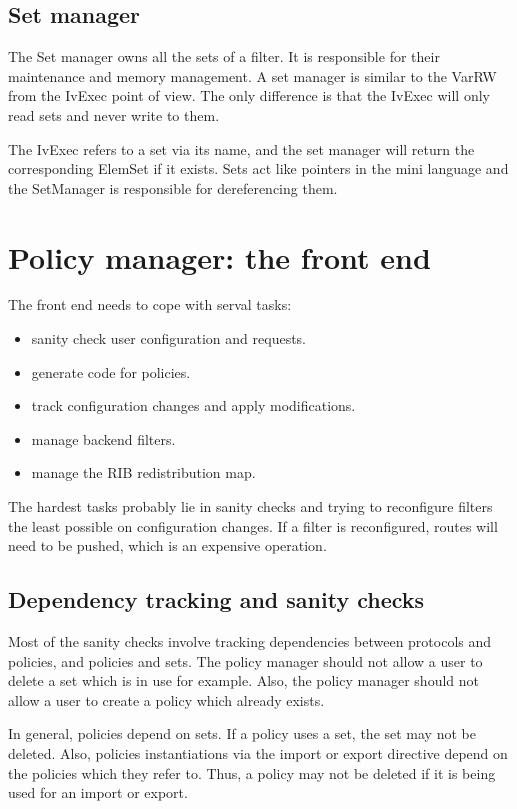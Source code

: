 \documentclass{article}
\begin{document}
\subsection{Set manager}
The Set manager owns all the sets of a filter. It is responsible for their
maintenance and memory management. A set manager is similar to the VarRW from
the IvExec point of view. The only difference is that the IvExec will only read
sets and never write to them.

The IvExec refers to a set via its name, and the set manager will return the
corresponding ElemSet if it exists. Sets act like pointers in the mini language
and the SetManager is responsible for dereferencing them.


\section{Policy manager: the front end}
The front end needs to cope with serval tasks:
\begin{itemize}
\item sanity check user configuration and requests.
\item generate code for policies.
\item track configuration changes and apply modifications.
\item manage backend filters.
\item manage the RIB redistribution map.
\end{itemize}
The hardest tasks probably lie in sanity checks and trying to reconfigure
filters the least possible on configuration changes. If a filter is
reconfigured, routes will need to be pushed, which is an expensive operation.

\subsection{Dependency tracking and sanity checks}
Most of the sanity checks involve tracking dependencies between protocols and
policies, and policies and sets. The policy manager should not allow a user to
delete a set which is in use for example. Also, the policy manager should not
allow a user to create a policy which already exists.

In general, policies depend on sets. If a policy uses a set, the set may not be
deleted. Also, policies instantiations via the import or export directive depend
on the policies which they refer to. Thus, a policy may not be deleted if it is
being used for an import or export.
\end{document}
